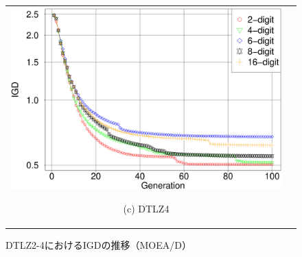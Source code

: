 \documentclass[../main/main]{subfiles}
\begin{document}
\begin{figure}[htbp]
\begin{tabular}{cc}
\begin{minipage}{0.32\hsize}
\includegraphics[width=1\linewidth]{../figures/MOEAD/DTLZ4_IGD.eps}
\begin{center}
{\footnotesize (c) DTLZ4}
\end{center}
\end{minipage}
\end{tabular}
\caption{DTLZ2-4におけるIGDの推移（MOEA/D）}
\label{fig:igd_dtlz_moead}
\end{figure}
\end{document}
